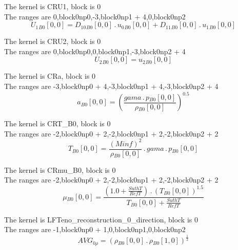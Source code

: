 \documentclass{article}
\begin{document}
\noindent The kernel is CRU1, block is 0\\\noindent The ranges are 0,block0np0,-3,block0np1 + 4,0,block0np2\\\begin{dmath}{U_{1}{_{B0}}}[{0,0}] = {D_{10}{_{B0}}}[{0,0}] \,.\, {u_{0}{_{B0}}}[{0,0}] + {D_{11}{_{B0}}}[{0,0}] \,.\, {u_{1}{_{B0}}}[{0,0}]\end{dmath}

\noindent The kernel is CRU2, block is 0\\\noindent The ranges are 0,block0np0,0,block0np1,-3,block0np2 + 4\\\begin{dmath}{U_{2}{_{B0}}}[{0,0}] = {u_{2}{_{B0}}}[{0,0}]\end{dmath}

\noindent The kernel is CRa, block is 0\\\noindent The ranges are -3,block0np0 + 4,-3,block0np1 + 4,-3,block0np2 + 4\\\begin{dmath}{a{_{B0}}}[{0,0}] = \left(\frac{gama \,.\, {p{_{B0}}}[{0,0}]}{{\rho{_{B0}}}[{0,0}]} \right)^{0.5}\end{dmath}

\noindent The kernel is CRT_B0, block is 0\\\noindent The ranges are -2,block0np0 + 2,-2,block0np1 + 2,-2,block0np2 + 2\\\begin{dmath}{T{_{B0}}}[{0,0}] = \frac{\left(Minf \right)^{2}}{{\rho{_{B0}}}[{0,0}]} \,.\, gama \,.\, {p{_{B0}}}[{0,0}]\end{dmath}

\noindent The kernel is CRmu_B0, block is 0\\\noindent The ranges are -2,block0np0 + 2,-2,block0np1 + 2,-2,block0np2 + 2\\\begin{dmath}{\mu{_{B0}}}[{0,0}] = \frac{\left(1.0 + \frac{SuthT}{RefT}\right) \,.\, \left({T{_{B0}}}[{0,0}] \right)^{1.5}}{{T{_{B0}}}[{0,0}] + \frac{SuthT}{RefT}}\end{dmath}

\noindent The kernel is LFTeno_reconstruction_0_direction, block is 0\\\noindent The ranges are -1,block0np0 + 1,0,block0np1,0,block0np2\\\begin{dmath}AVG_{0 \rho} = \left({\rho{_{B0}}}[{0,0}] \,.\, {\rho{_{B0}}}[{1,0}] \right)^{\frac{1}{2}}\end{dmath}
\end{document}
